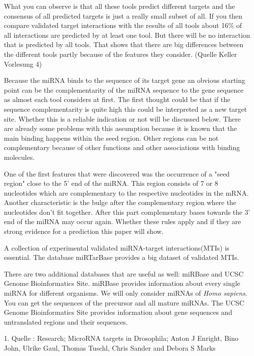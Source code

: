 \documentclass[12pt]{article}
\begin{document}
What you can observe is that all these tools predict different targets and the consensus of all predicted targets is just a really small subset of all. If you then compare validated target interactions with the results of all tools about 16\% of all interactions are predicted by at least one tool. But there will be no interaction that is predicted by all tools. That shows that there are big differences between the different tools partly because of the features they consider. (Quelle Keller Vorlesung 4) 

Because the miRNA binds to the sequence of its target gene an obvious starting point can be the complementarity of the miRNA sequence to the gene sequence as almost each tool considers at first. The first thought could be that if the sequence complementarity is quite high this could be interpreted as a new target site. Whether this is a reliable indication or not will be discussed below. There are already some problems with this assumption because it is known that the main binding happens within the seed region. Other regions can be not complementary because of other functions and other associations with binding molecules.

One of the first features that were discovered was the occurrence of a "seed region" close to the 5' end of the miRNA. This region consists of 7 or 8 nucleotides which are complementary to the respective nucleotides in the mRNA. Another characteristic is the bulge after the complementary region where the nucleotides don't fit together. After this part complementary bases towards the 3' end of the miRNA may occur again. Whether these rules apply and if they are strong evidence for a prediction this paper will show. 

A collection of experimental validated miRNA-target interactions(MTIs) is essential. The database miRTarBase provides a big dataset of validated MTIs. 

There are two additional databases that are useful as well: miRBase and UCSC Genome Bioinformatics Site. miRBase provides information about every single miRNA for different organisms. We will only consider miRNAs of \textit{Homo sapiens}. You can get the sequences of the precursor and all mature miRNAs. The UCSC Genome Bioinformatics Site provides information about gene sequences and untranslated regions and their sequences.
 
1. Quelle : Research; MicroRNA targets in Drosophila; Anton J Enright, Bino John, Ulrike Gaul, Thomas Tuschl, Chris Sander and Debora S Marks \\
\\
\end{document}
